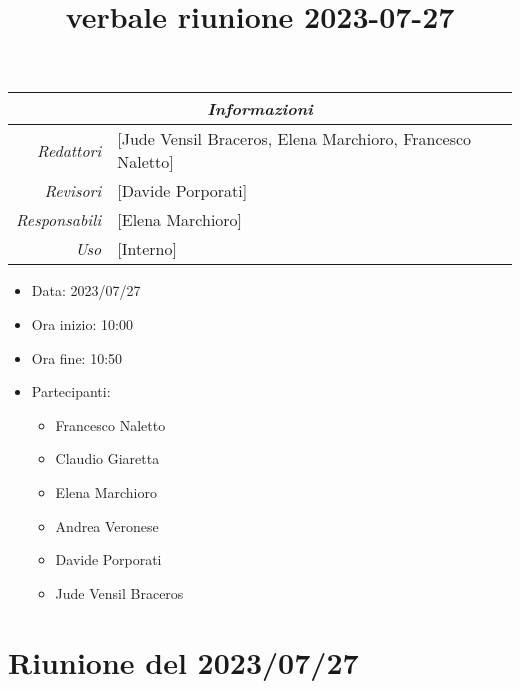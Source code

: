 \documentclass[12pt]{article}
\begin{document}
\graphicspath{ {../../templates/img} }

\title{verbale riunione 2023-07-27}

\firstPage
\maketitle

\begin{center}
\begin{tabular}{r | l}
    \multicolumn{2}{c}{\textit{Informazioni}}\\
    \hline
    
        \textit{Redattori} &
        [Jude Vensil Braceros, Elena Marchioro, Francesco Naletto]\makecell{}\\
    
        \textit{Revisori} &
        [Davide Porporati]\makecell{}\\
        \textit{Responsabili} &
        [Elena Marchioro]\makecell{}\\
            \textit{Uso} & 
            [Interno]\makecell{}\\
\end{tabular}
    \begin{itemize}
    \item[] Data: 2023/07/27
    \item[] Ora inizio: 10:00
    \item[] Ora fine: 10:50
    \item[] Partecipanti:
    \begin{itemize}
    \item[] Francesco Naletto
    \item[] Claudio Giaretta
    \item[] Elena Marchioro
    \item[] Andrea Veronese
    \item[] Davide Porporati
    \item[] Jude Vensil Braceros
    \end{itemize}
\end{itemize}
\end{center}


\tableofcontents
\printindex 
\section{Riunione del 2023/07/27}
\end{document}
